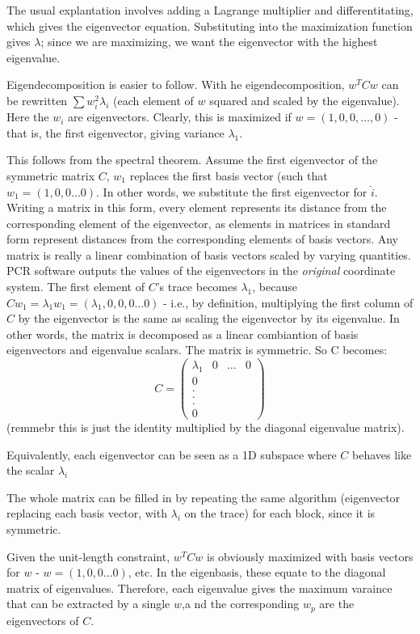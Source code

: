 \documentclass[
]{article}
\begin{document}
The usual explantation involves adding a Lagrange multiplier and
differentitating, which gives the eigenvector equation. Substituting
into the maximization function gives \(\lambda\); since we are
maximizing, we want the eigenvector with the highest eigenvalue.

Eigendecomposition is easier to follow. With he eigendecomposition,
\(w^TCw\) can be rewritten \(\sum{w^2_i}\lambda_i\) (each element of
\(w\) squared and scaled by the eigenvalue). Here the \(w_i\) are
eigenvectors. Clearly, this is maximized if \(w = (1,0,0,\dots,0)\) -
that is, the first eigenvector, giving variance \(\lambda_1\).

This follows from the spectral theorem. Assume the first eigenvector of
the symmetric matrix \(C\), \(w_1\) replaces the first basis vector
(such that \(w_1 = (1,0,0...0)\). In other words, we substitute the
first eigenvector for \(\hat{i}\). Writing a matrix in this form, every
element represents its distance from the corresponding element of the
eigenvector, as elements in matrices in standard form represent
distances from the corresponding elements of basis vectors. Any matrix
is really a linear combination of basis vectors scaled by varying
quantities. PCR software outputs the values of the eigenvectors in the
\emph{original} coordinate system. The first element of \(C\)'s trace
becomes \(\lambda_1\), because
\(Cw_1=\lambda_1w_1 = (\lambda_1,0,0,0...0)\) - i.e., by definition,
multiplying the first column of \(C\) by the eigenvector is the same as
scaling the eigenvector by its eigenvalue. In other words, the matrix is
decomposed as a linear combiantion of basis eigenvectors and eigenvalue
scalars. The matrix is symmetric. So C becomes: \[C =
\begin{pmatrix}
\lambda_1&0&\dots&0\\
0\\
.\\
.\\
.\\
0
\end{pmatrix}\] (remmebr this is just the identity multiplied by the
diagonal eigenvalue matrix).

Equivalently, each eigenvector can be seen as a 1D subspace where \(C\)
behaves like the scalar \(\lambda_i\)

The whole matrix can be filled in by repeating the same algorithm
(eigenvector replacing each basis vector, with \(\lambda_i\) on the
trace) for each block, since it is symmetric.

Given the unit-length constraint, \(w^TCw\) is obviously maximized with
basis vectors for \(w\) - \(w= (1,0,0...0)\), etc. In the eigenbasis,
these equate to the diagonal matrix of eigenvalues. Therefore, each
eigenvalue gives the maximum varaince that can be extracted by a single
\(w\),a nd the corresponding \(w_p\) are the eigenvectors of \(C\).
\end{document}
